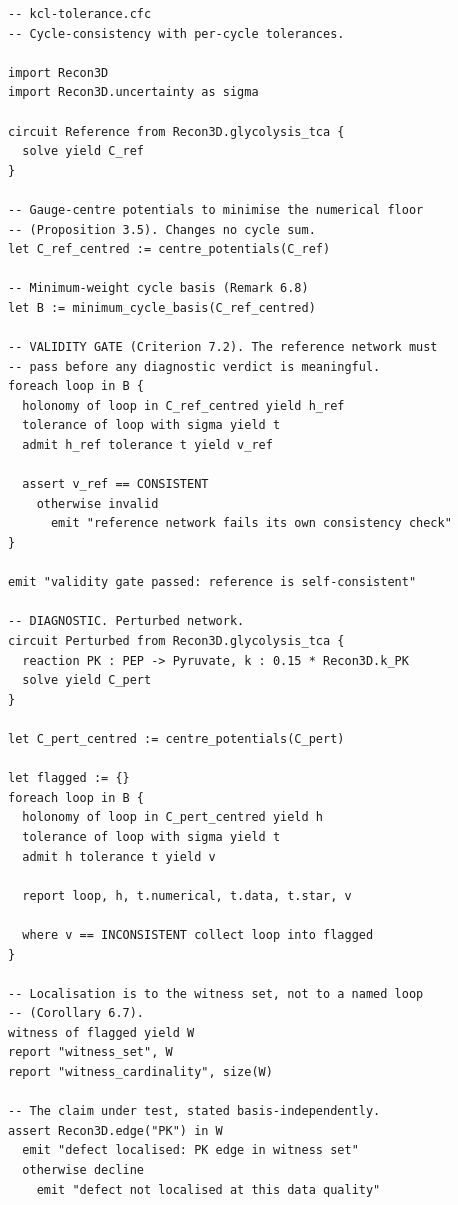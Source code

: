 \documentclass[11pt,twocolumn,a4paper]{article}
\theoremstyle{pstyle}
\theoremstyle{definition}
\theoremstyle{remark}
\begin{document}
\begin{lstlisting}[caption={The cycle-consistency test with cycle-local
tolerances. Every verdict carries its tolerance by
\Cref{thm:no-bare-verdict}; the validity gate of \Cref{crit:invalid}
precedes any diagnostic claim.},label={lst:program}]
-- kcl-tolerance.cfc
-- Cycle-consistency with per-cycle tolerances.

import Recon3D
import Recon3D.uncertainty as sigma

circuit Reference from Recon3D.glycolysis_tca {
  solve yield C_ref
}

-- Gauge-centre potentials to minimise the numerical floor
-- (Proposition 3.5). Changes no cycle sum.
let C_ref_centred := centre_potentials(C_ref)

-- Minimum-weight cycle basis (Remark 6.8)
let B := minimum_cycle_basis(C_ref_centred)

-- VALIDITY GATE (Criterion 7.2). The reference network must
-- pass before any diagnostic verdict is meaningful.
foreach loop in B {
  holonomy of loop in C_ref_centred yield h_ref
  tolerance of loop with sigma yield t
  admit h_ref tolerance t yield v_ref

  assert v_ref == CONSISTENT
    otherwise invalid
      emit "reference network fails its own consistency check"
}

emit "validity gate passed: reference is self-consistent"

-- DIAGNOSTIC. Perturbed network.
circuit Perturbed from Recon3D.glycolysis_tca {
  reaction PK : PEP -> Pyruvate, k : 0.15 * Recon3D.k_PK
  solve yield C_pert
}

let C_pert_centred := centre_potentials(C_pert)

let flagged := {}
foreach loop in B {
  holonomy of loop in C_pert_centred yield h
  tolerance of loop with sigma yield t
  admit h tolerance t yield v

  report loop, h, t.numerical, t.data, t.star, v

  where v == INCONSISTENT collect loop into flagged
}

-- Localisation is to the witness set, not to a named loop
-- (Corollary 6.7).
witness of flagged yield W
report "witness_set", W
report "witness_cardinality", size(W)

-- The claim under test, stated basis-independently.
assert Recon3D.edge("PK") in W
  emit "defect localised: PK edge in witness set"
  otherwise decline
    emit "defect not localised at this data quality"
\end{lstlisting}
\end{document}
